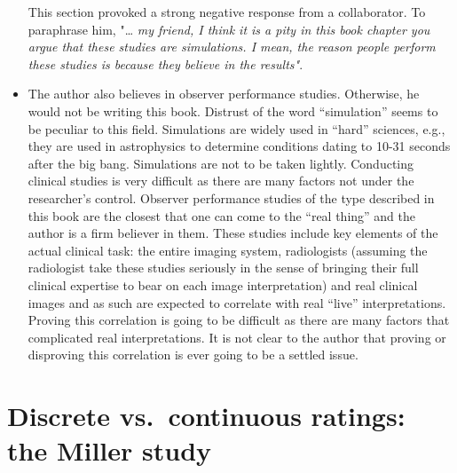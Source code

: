 \documentclass[
]{book}
\begin{document}
\begin{itemize}
  This section provoked a strong negative response from a collaborator. To paraphrase him, "\ldots{} \emph{my friend, I think it is a pity in this book chapter you argue that these studies are simulations. I mean, the reason people perform these studies is because they believe in the results"}.
\item
  The author also believes in observer performance studies. Otherwise, he would not be writing this book. Distrust of the word ``simulation'' seems to be peculiar to this field. Simulations are widely used in ``hard'' sciences, e.g., they are used in astrophysics to determine conditions dating to 10-31 seconds after the big bang. Simulations are not to be taken lightly. Conducting clinical studies is very difficult as there are many factors not under the researcher's control. Observer performance studies of the type described in this book are the closest that one can come to the ``real thing'' and the author is a firm believer in them. These studies include key elements of the actual clinical task: the entire imaging system, radiologists (assuming the radiologist take these studies seriously in the sense of bringing their full clinical expertise to bear on each image interpretation) and real clinical images and as such are expected to correlate with real ``live'' interpretations. Proving this correlation is going to be difficult as there are many factors that complicated real interpretations. It is not clear to the author that proving or disproving this correlation is ever going to be a settled issue.
\end{itemize}

\hypertarget{discrete-vs.-continuous-ratings-the-miller-study}{%
\section{Discrete vs.~continuous ratings: the Miller study}\label{discrete-vs.-continuous-ratings-the-miller-study}}
\end{document}
